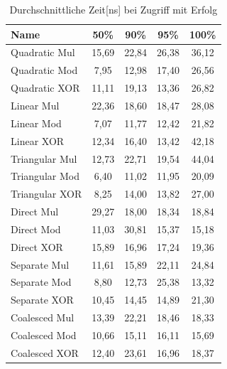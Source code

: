\begin{table}[!ht]
\begin{tabular}{l|cccc}
    Name & 50\% & 90\% & 95\% & 100\% \\
    \hline
    Quadratic Mul & 15,69 & 22,84 & 26,38 & 36,12 \\
    Quadratic Mod & 7,95 & 12,98 & 17,40 & 26,56 \\
    Quadratic XOR & 11,11 & 19,13 & 13,36 & 26,82 \\
    \hline
    Linear Mul & 22,36 & 18,60 & 18,47 & 28,08 \\
    Linear Mod & 7,07 & 11,77 & 12,42 & 21,82 \\
    Linear XOR & 12,34 & 16,40 & 13,42 & 42,18 \\
    \hline
    Triangular Mul & 12,73 & 22,71 & 19,54 & 44,04 \\
    Triangular Mod & 6,40 & 11,02 & 11,95 & 20,09 \\
    Triangular XOR & 8,25 & 14,00 & 13,82 & 27,00 \\
    \hline
    Direct Mul & 29,27 & 18,00 & 18,34 & 18,84 \\
    Direct Mod & 11,03 & 30,81 & 15,37  & 15,18 \\
    Direct XOR & 15,89 & 16,96 & 17,24  & 19,36 \\
    \hline
    Separate Mul & 11,61 & 15,89 & 22,11 & 24,84 \\
    Separate Mod & 8,80 & 12,73 & 25,38 & 13,32 \\
    Separate XOR & 10,45 & 14,45 & 14,89 & 21,30 \\
    \hline
    Coalesced Mul & 13,39 & 22,21 & 18,46 & 18,33 \\
    Coalesced Mod & 10,66 & 15,11 & 16,11 & 15,69 \\
    Coalesced XOR & 12,40 & 23,61 & 16,96 & 18,37 \\
\end{tabular}
\centering
\caption{Durchschnittliche Zeit[ns] bei Zugriff mit Erfolg}
\end{table}
